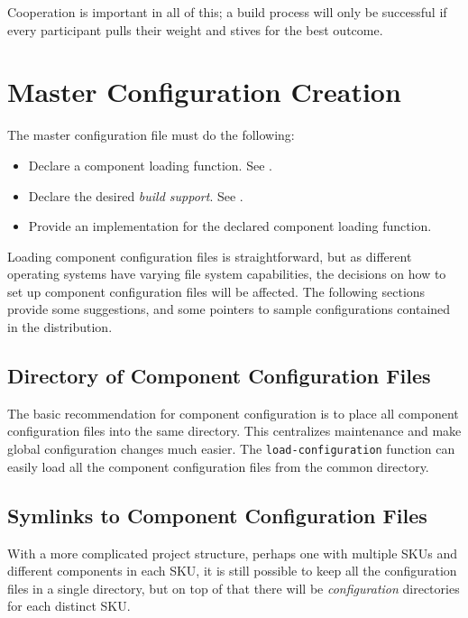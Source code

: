 Cooperation is important in all of this; a build process will only be
successful if every participant pulls their weight and stives for the
best outcome.

\section{Master Configuration Creation}\label{wrap:master-configuration}

The master configuration file must do the following:

\begin{itemize}
\item Declare a component loading function.  See
  .
\item Declare the desired \emph{build support}.  See
  .
\item Provide an implementation for the declared component loading
  function.
\end{itemize}

Loading component configuration files is straightforward, but as
different operating systems have varying file system capabilities, the
decisions on how to set up component configuration files will be
affected.  The following sections provide some suggestions, and some
pointers to sample configurations contained in the \lmsbw
distribution.

\subsection{Directory of Component Configuration Files}\label{wrap:directory}

The basic recommendation for \lmsbw component configuration is to
place all component configuration files into the same directory.  This
centralizes maintenance and make global configuration changes much
easier.  The \texttt{load-configuration} function can easily load all
the component configuration files from the common directory.

\subsection{Symlinks to Component Configuration Files}

With a more complicated project structure, perhaps one with multiple
SKUs and different components in each SKU, it is still possible to
keep all the configuration files in a single directory, but on top of
that there will be \emph{configuration} directories for each distinct
SKU.

